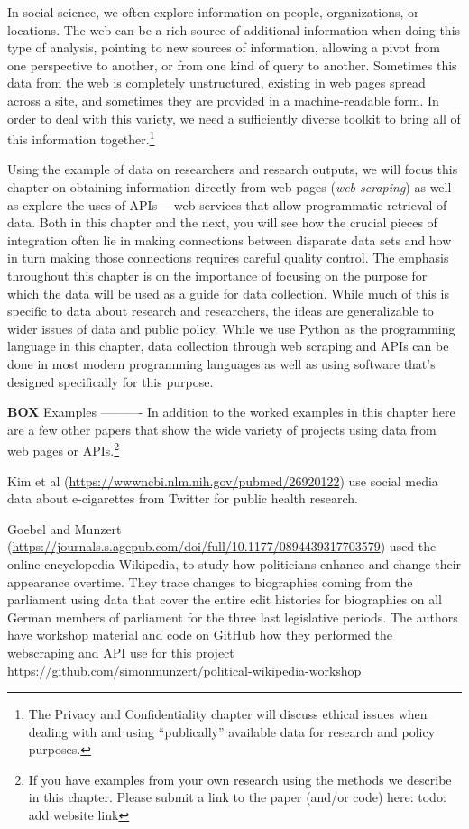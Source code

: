 \documentclass[]{krantz}
\begin{document}
In social science, we often explore information on people,
organizations, or locations. The web can be a rich source of additional
information when doing this type of analysis, pointing to new sources of
information, allowing a pivot from one perspective to another, or from
one kind of query to another. Sometimes this data from the web is
completely unstructured, existing in web pages spread across a site, and
sometimes they are provided in a machine-readable form. In order to deal
with this variety, we need a sufficiently diverse toolkit to bring all
of this information together.\footnote{The Privacy and Confidentiality
  chapter will discuss ethical issues when dealing with and using
  ``publically'' available data for research and policy purposes.}

Using the example of data on researchers and research outputs, we will
focus this chapter on obtaining information directly from web pages
(\emph{web scraping}) as well as explore the uses of APIs--- web
services that allow programmatic retrieval of data. Both in this chapter
and the next, you will see how the crucial pieces of integration often
lie in making connections between disparate data sets and how in turn
making those connections requires careful quality control. The emphasis
throughout this chapter is on the importance of focusing on the purpose
for which the data will be used as a guide for data collection. While
much of this is specific to data about research and researchers, the
ideas are generalizable to wider issues of data and public policy. While
we use Python as the programming language in this chapter, data
collection through web scraping and APIs can be done in most modern
programming languages as well as using software that's designed
specifically for this purpose.

\textbf{BOX} Examples ---------- In addition to the worked examples in
this chapter here are a few other papers that show the wide variety of
projects using data from web pages or APIs.\footnote{If you have
  examples from your own research using the methods we describe in this
  chapter. Please submit a link to the paper (and/or code) here: todo:
  add website link}

Kim et al (\url{https://wwwncbi.nlm.nih.gov/pubmed/26920122}) use social
media data about e-cigarettes from Twitter for public health research.

Goebel and Munzert
(\url{https://journals.s.agepub.com/doi/full/10.1177/0894439317703579})
used the online encyclopedia Wikipedia, to study how politicians enhance
and change their appearance overtime. They trace changes to biographies
coming from the parliament using data that cover the entire edit
histories for biographies on all German members of parliament for the
three last legislative periods. The authors have workshop material and
code on GitHub how they performed the webscraping and API use for this
project
\url{https://github.com/simonmunzert/political-wikipedia-workshop}
\end{document}
